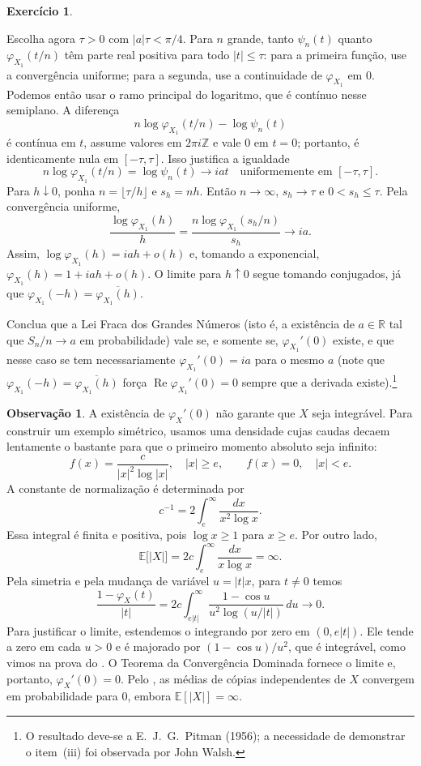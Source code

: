 \documentclass[12pt,portuguese]{article}
\theoremstyle{definition}
\theoremstyle{plainexercise}
\theoremstyle{starredexercise}
\newtheorem{starredexercise}[exercise]{Exercício}
\theoremstyle{definition}
\newtheorem*{remark*}{Observação}
\begin{document}
\begin{starredexercise}
\begin{enumerate}
Escolha agora $\tau>0$ com $|a|\tau<\pi/4$. Para $n$ grande, tanto
$\psi_n(t)$ quanto $\varphi_{X_1}(t/n)$ têm parte real positiva para todo
$|t|\leqslant\tau$: para a primeira função, use a convergência uniforme;
para a segunda, use a continuidade de $\varphi_{X_1}$ em $0$. Podemos então
usar o ramo principal do logaritmo, que é contínuo nesse semiplano.
A diferença
\[
n\log\varphi_{X_1}(t/n)-\log\psi_n(t)
\]
é contínua em $t$, assume valores em $2\pi i\mathbb{Z}$ e vale $0$ em $t=0$;
portanto, é identicamente nula em $[-\tau,\tau]$. Isso justifica a igualdade
\[
n\log\varphi_{X_1}(t/n)=\log\psi_n(t)\longrightarrow iat
\quad\text{uniformemente em }[-\tau,\tau].
\]
Para $h\downarrow0$, ponha $n=\lfloor\tau/h\rfloor$ e $s_h=nh$. Então
$n\to\infty$, $s_h\to\tau$ e $0<s_h\leqslant\tau$. Pela convergência uniforme,
\[
\frac{\log\varphi_{X_1}(h)}{h}
=\frac{n\log\varphi_{X_1}(s_h/n)}{s_h}
\longrightarrow ia.
\]
Assim, $\log\varphi_{X_1}(h)=iah+o(h)$ e, tomando a exponencial,
$\varphi_{X_1}(h)=1+iah+o(h)$. O limite para $h\uparrow0$ segue tomando
conjugados, já que
$\varphi_{X_1}(-h)=\overline{\varphi_{X_1}(h)}$.
\end{enumerate}
Conclua que a Lei Fraca dos Grandes Números (isto é, a existência de
$a\in\mathbb{R}$ tal que $S_n/n\to a$ em probabilidade) vale se, e somente se,
$\varphi_{X_1}'(0)$ existe, e que nesse caso se tem necessariamente
$\varphi_{X_1}'(0)=ia$ para o mesmo $a$ (note que
$\varphi_{X_1}(-h)=\overline{\varphi_{X_1}(h)}$ força
$\operatorname{Re}\varphi_{X_1}'(0)=0$ sempre que a derivada existe).\footnote{%
O resultado deve-se a E.~J.~G.~Pitman (1956); a necessidade de demonstrar o
item~(iii) foi observada por John Walsh.}
\end{starredexercise}

\begin{remark*}
A existência de $\varphi_X'(0)$ não garante que $X$ seja integrável. Para
construir um exemplo simétrico, usamos uma densidade cujas caudas decaem
lentamente o bastante para que o primeiro momento absoluto seja infinito:
\[
f(x)=\frac{c}{|x|^2\log|x|},\quad |x|\geqslant e,
\qquad f(x)=0,\quad |x|<e.
\]
A constante de normalização é determinada por
\[
c^{-1}=2\int_e^\infty\frac{dx}{x^2\log x}.
\]
Essa integral é finita e positiva, pois $\log x\geqslant1$ para $x\geqslant e$.
Por outro lado,
\[
\mathbb{E}\bigl[|X|\bigr]=2c\int_e^\infty\frac{dx}{x\log x}=\infty.
\]
Pela simetria e pela mudança de variável $u=|t|x$, para $t\neq0$ temos
\[
\frac{1-\varphi_X(t)}{|t|}
=2c\int_{e|t|}^\infty\frac{1-\cos u}{u^2\log(u/|t|)}\,du
\longrightarrow0.
\]
Para justificar o limite, estendemos o integrando por zero em $(0,e|t|)$.
Ele tende a zero em cada $u>0$ e é majorado por $(1-\cos u)/u^2$, que é
integrável, como vimos na prova do . O Teorema da
Convergência Dominada fornece o limite e, portanto, $\varphi_X'(0)=0$.
Pelo , as médias de cópias independentes de $X$
convergem em probabilidade para $0$, embora $\mathbb{E}[|X|]=\infty$.
\end{remark*}
\end{document}
